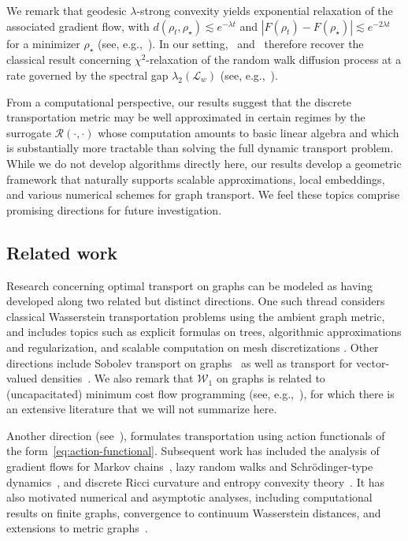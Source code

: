 \documentclass[11pt,a4paper]{article}
\newcommand{\Wass}{\mathcal{W}}
\newcommand{\Resis}{\mathcal{R}}
\begin{document}
We remark that geodesic $\lambda$-strong convexity yields exponential relaxation of the associated gradient flow, with $d(\rho_t,\rho_\star)\lesssim e^{-\lambda t}$ and $|F(\rho_t)-F(\rho_\star)|\lesssim e^{-2\lambda t}$ for a minimizer $\rho_\star$ (see, e.g.,~\cite[Sec. 11.2]{ambrosio2005gradient}). In our setting,~ and~ therefore recover the classical result concerning $\chi^2$-relaxation of the random walk diffusion process at a rate governed by the spectral gap $\lambda_2(\mathcal{L}_w)$ (see, e.g.,~\cite{chung1997spectral}).

From a computational perspective, our results suggest that the discrete transportation metric may be well approximated in certain regimes by the surrogate $\Resis(\cdot,\cdot)$ whose computation amounts to basic linear algebra and which is substantially more tractable than solving the full dynamic transport problem. While we do not develop algorithms directly here, our results develop a geometric framework that naturally supports scalable approximations, local embeddings, and various numerical schemes for graph transport. We feel these topics comprise promising directions for future investigation.

\subsection{Related work}\label{subsec:related-work}

Research concerning optimal transport on graphs can be modeled as having developed along two related but distinct directions. One such thread considers classical Wasserstein transportation problems using the ambient graph metric, and includes topics such as explicit formulas on trees, algorithmic approximations and regularization, and scalable computation on mesh discretizations \cite{evans2012phylogenetic,mcgregor2013sketching,solomon2014earth,essid2018quadratically}. Other directions include Sobolev transport on graphs~\cite{le2022sobolev,le2023scalable,le2024generalized} as well as transport for vector-valued densities~\cite{robertson2025generalization,chen2018vector}. We also remark that $\Wass_{1}$ on graphs is related to (uncapacitated) minimum cost flow programming (see, e.g.,~\cite[Ch. 6]{peyre2019computational}), for which there is an extensive literature that we will not summarize here.

Another direction (see~\cite{maas2011gradient,mielke2011gradient,li2022transport}), formulates transportation using action functionals of the form~\cref{eq:action-functional}. Subsequent work has included the analysis of gradient flows for Markov chains~\cite{chow2012fokker}, lazy random walks and Schr\"odinger-type dynamics~\cite{leonard2015lazy,chow2019discrete}, and discrete Ricci curvature and entropy convexity theory~\cite{erbar2012ricci,mielke2013geodesic,erbar2014gradient}. It has also motivated numerical and asymptotic analyses, including computational results on finite graphs, convergence to continuum Wasserstein distances, and extensions to metric graphs~\cite{erbar2020computation,gigli2013gromov,erbar2022gradient}.
\end{document}
